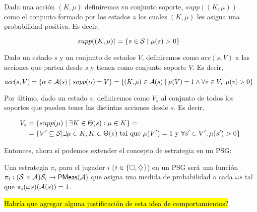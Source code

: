 \begin{definition}
	Dada una acción $(K, \mu)$ definiremos su conjunto soporte, $supp((K, \mu))$ como el conjunto formado por los estados a los cuales $(K, \mu)$ les asigna una probabilidad positiva. Es decir,

	$$supp((K, \mu)) = \{s \in \mathcal{S} \mid \mu(s) > 0\}$$

	Dado un estado $s$ y un conjunto de estados $V$, definiremos como $acc(s, V)$ a
	las acciones que parten desde $s$ y tienen como conjunto soporte $V$. Es decir,

	$$acc(s, V) = \{\alpha \in \mathcal{A}(s) \mid supp(\alpha) = V\} = \{(K, \mu) \in \mathcal{A}(s) \mid \mu(V) = 1 \wedge \forall v \in V, \ \mu(v) > 0\}$$

	Por último, dado un estado $s$, definiremos como $V_s$ al conjunto de todos los
	soportes que pueden tener las distintas acciones desde $s$. Es decir,

	\begin{align*}~\label{definicionVs}
		V_s &= \{supp(\mu) \mid \exists K \in \Theta(s): \mu \in K\} = \\
		&= \{V' \subseteq \mathcal{S} | \exists \mu \in K, K \in \Theta(s) \text{ tal que } \mu(V') = 1 \text{ y } \forall s' \in V', \mu(s') > 0\}
	\end{align*}

\end{definition}

Entonces, ahora sí podemos extender el concepto de estrategia en un PSG:

\begin{definition}
	Una estrategia $\pi_i$ para el jugador $i$ ($i \in \{\square, \diamondsuit\}$) en un PSG será una función $\pi_i : (\mathcal{S} \times \mathcal{A}) \mathcal{S}_i \rightarrow \textsf{PMeas}(\mathcal{A})$ que asigna una medida de probabilidad a cada $\omega s$ tal que $\pi_i(\omega s)(\mathcal{A}(s)) = 1$.
\end{definition}

\hl{Habría que agregar alguna justificación de esta idea de comportamientos?}

